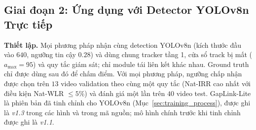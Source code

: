 \begin{table}[H]
    \centering
    \caption{Giai đoạn 1 --- tracker trực tuyến trên $40$ chuỗi test ($1\,922$ khoảng che khuất được chèn, $a_{\max}=95$)}
    \label{tab:tracker_results}
\end{table}

\subsection{Giai đoạn 2: Ứng dụng với Detector YOLOv8n Trực tiếp}
\label{sec:phase2}

\textbf{Thiết lập.} Mọi phương pháp nhận cùng detection YOLOv8n (kích thước đầu vào $640$, ngưỡng tin cậy $0.28$) và dùng chung tracker tầng 1, cửa sổ track bị mất ($a_{\max}=95$) và quy tắc giám sát; chỉ module tái liên kết khác nhau. Ground truth chỉ được dùng sau đó để chấm điểm. Với mọi phương pháp, ngưỡng chấp nhận được chọn trên $13$ video validation theo cùng một quy tắc (Nat-IRR cao nhất với điều kiện Nat-WLR $\le 5\%$) và đánh giá một lần trên $40$ video test. GapLink-Lite là phiên bản đã tinh chỉnh cho YOLOv8n (Mục~\ref{sec:training_process}), được ghi là \emph{v1.3} trong các hình và trong mã nguồn; mô hình chính trước khi tinh chỉnh được ghi là \emph{v1.1}.


